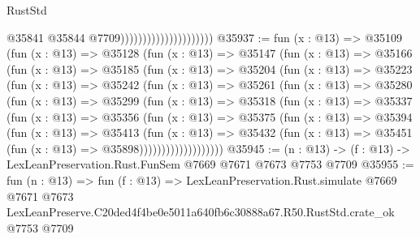 \begin{lexlean}{RustStd}
\begin{coremodule}
                                              @35841
                                              @35844
                                              @7709)))))))))))))))))))))
@35937 := fun (x : @13) =>
  @35109
    (fun (x : @13) =>
    @35128
      (fun (x : @13) =>
      @35147
        (fun (x : @13) =>
        @35166
          (fun (x : @13) =>
          @35185
            (fun (x : @13) =>
            @35204
              (fun (x : @13) =>
              @35223
                (fun (x : @13) =>
                @35242
                  (fun (x : @13) =>
                  @35261
                    (fun (x : @13) =>
                    @35280
                      (fun (x : @13) =>
                      @35299
                        (fun (x : @13) =>
                        @35318
                          (fun (x : @13) =>
                          @35337
                            (fun (x : @13) =>
                            @35356
                              (fun (x : @13) =>
                              @35375
                                (fun (x : @13) =>
                                @35394
                                  (fun (x : @13) =>
                                  @35413
                                    (fun (x : @13) =>
                                    @35432
                                      (fun (x : @13) =>
                                      @35451 (fun (x : @13) => @35898)))))))))))))))))))
@35945 := (n : @13) -> (f : @13) -> LexLeanPreservation.Rust.FunSem @7669 @7671 @7673 @7753 @7709
@35955 := fun (n : @13) =>
  fun (f : @13) =>
  LexLeanPreservation.Rust.simulate
    @7669
    @7671
    @7673
    LexLeanPreserve.C20ded4f4be0e5011a640fb6c30888a67.R50.RustStd.crate_ok
    @7753
    @7709
\end{coremodule}
\end{lexlean}
